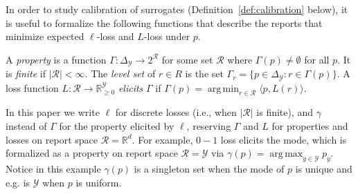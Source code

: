 \documentclass[anon]{colt2020} %
\newcommand{\reals}{\mathbb{R}}
\newcommand{\nonnegreals}{\reals_{\geq 0}}%
\newcommand{\simplex}{\Delta_\Y}
\newcommand{\R}{\mathcal{R}}
\newcommand{\Y}{\mathcal{Y}}
\newcommand{\inprod}[2]{\langle #1, #2 \rangle}%
\DeclareMathOperator*{\argmax}{arg\,max}
\DeclareMathOperator*{\argmin}{arg\,min}
\begin{document}
In order to study calibration of surrogates (Definition~\ref{def:calibration} below), it is useful to formalize the following functions that describe the reports that minimize expected $\ell$-loss and $L$-loss under $p$.
\begin{definition}
  A \emph{property} is a function $\Gamma: \simplex \to 2^{\R}$ for some set $\R$ where $\Gamma(p) \neq \emptyset$ for all $p$.
  It is \emph{finite} if $|\R| < \infty$.
  The \emph{level set} of $r \in R$ is the set $\Gamma_r = \{p \in \simplex : r \in \Gamma(p)\}$.
  A loss function $L: \R \to \nonnegreals^{\Y}$ \emph{elicits} $\Gamma$ if $\Gamma(p) = \argmin_{r \in \R} \inprod{p}{L(r)}$.
\end{definition}
In this paper we write $\ell$ for discrete losses (i.e., when $|\R|$ is finite), and $\gamma$ instead of $\Gamma$ for the property elicited by $\ell$, reserving $\Gamma$ and $L$ for properties and losses on report space $\R=\reals^d$.
For example, $0-1$ loss elicits the mode, which is formalized as a property on report space $\R = \Y$ via $\gamma(p) = \argmax_{y \in \Y} p_y$.
Notice in this example $\gamma(p)$ is a singleton set when the mode of $p$ is unique and e.g. is $\Y$ when $p$ is uniform.
\end{document}
